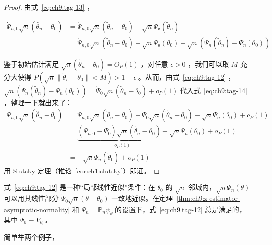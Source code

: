 \begin{proof}

由式~\eqref{eq:ch9:tag-13} ，

\begin{equation}
\label{eq:ch9:tag-14}
\begin{aligned}\dot{\Psi}_{n,0} \sqrt{n}(\widehat{\theta}_n - \theta_0) &= \dot{\Psi}_{n,0} \sqrt{n}(\widetilde{\theta}_n - \theta_0) - \sqrt{n}\Psi_n(\widetilde{\theta}_n)\\ &=\dot{\Psi}_{n,0} \sqrt{n}(\widetilde{\theta}_n - \theta_0)- \sqrt{n}\Psi_n(\theta_0) - \sqrt{n}\left(\Psi_n(\widetilde{\theta}_n) - \Psi_n(\theta_0)\right) \end{aligned}
\end{equation}

鉴于初始估计满足 $\sqrt n(\widetilde\theta_n-\theta_0)=O_P(1)$ ，对任意 $\epsilon>0$ ，我们可以取 $M$ 充分大使得 $P(\sqrt{n}\|\widetilde{\theta}_n-\theta_0\|<M)>1-\epsilon$ 。从而，由式~\eqref{eq:ch9:tag-12} ， $\sqrt{n}\left(\Psi_n(\widetilde{\theta}_n) - \Psi_n(\theta_0)\right) = \dot{\Psi}_0 \sqrt{n}(\widetilde{\theta}_n - \theta_0) + o_P(1)$ 代入式~\eqref{eq:ch9:tag-14} ，整理一下就出来了：\[\begin{aligned} \dot{\Psi}_{n,0} \sqrt{n} (\widehat{\theta}_n - \theta_0) &= \dot{\Psi}_{n,0} \sqrt{n} (\widetilde{\theta}_n - \theta_0) - \dot{\Psi}_0 \sqrt{n} (\widetilde{\theta}_n - \theta_0) - \sqrt{n} \Psi_n(\theta_0) + o_P(1) \\ &= \underbrace{\left( \dot{\Psi}_{n,0} - \dot{\Psi}_0 \right) \sqrt{n} (\widetilde{\theta}_n - \theta_0)}_{=o_P(1)} - \sqrt{n} \Psi_n(\theta_0) + o_P(1) \\ &= -\sqrt{n} \Psi_n(\widetilde{\theta}_0) + o_P(1) \end{aligned}\]
用 Slutsky 定理（推论~\ref{cor:ch1:slutsky}）即证。

\end{proof}

\begin{remark}
式~\eqref{eq:ch9:tag-12} 是一种``局部线性近似''条件：在 $\theta_0$ 的 $\sqrt{n}$ 邻域内，$\sqrt{n}\Psi_n(\theta)$ 可以用其线性部分 $\dot{\Psi}_0 \sqrt{n}(\theta-\theta_0)$ 一致地近似。在定理~\ref{thm:ch9:z-estimator-asymptotic-normality} 和 $\Psi_n=\mathbb P_n\psi_{\theta}$ 的设置下，式~\eqref{eq:ch9:tag-12} 总是满足的，其中 $\dot\Psi_0=V_{\theta_0}$。
\end{remark}

简单举两个例子，

